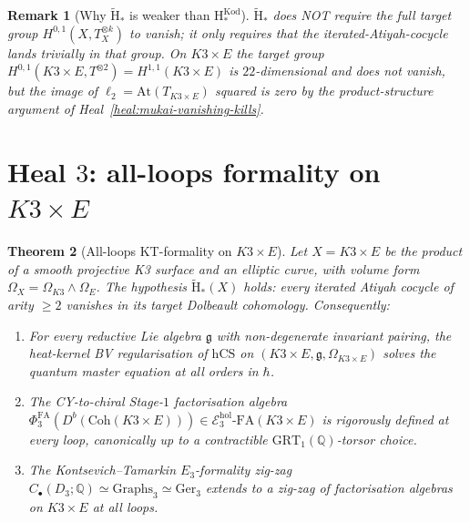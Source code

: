 \documentclass[11pt]{article}
\newtheorem{theorem}{Theorem}[section]
\newtheorem{remark}[theorem]{Remark}
\providecommand{\At}{\mathrm{At}}
\providecommand{\hCS}{\mathrm{hCS}}
\providecommand{\Coh}{\mathrm{Coh}}
\providecommand{\Om}{\Omega}
\providecommand{\fg}{\mathfrak{g}}
\providecommand{\QQ}{\mathbb{Q}}
\providecommand{\PhiFA}{\Phi^{\mathrm{FA}}}
\providecommand{\Ger}{\mathrm{Ger}}
\providecommand{\GRT}{\mathrm{GRT}}
\providecommand{\Graphs}{\mathrm{Graphs}}
\begin{document}
\begin{remark}[Why $\widetilde{\mathrm{H}}_*$ is weaker than
$\mathrm{H}_*^{\mathrm{Kod}}$]
\label{rem:tilde-weaker}
$\widetilde{\mathrm{H}}_*$ does NOT require the full target group
$H^{0,1}(X, T_X^{\otimes k})$ to vanish;  it only requires that
the iterated-Atiyah-cocycle lands trivially in that group.  On
$K3 \times E$ the target group $H^{0,1}(K3 \times E, T^{\otimes 2})
= H^{1,1}(K3 \times E)$ is $22$-dimensional and does not vanish,
but the \emph{image} of $\ell_2 = \At(T_{K3\times E})$ squared is
zero by the product-structure argument of
Heal~\ref{heal:mukai-vanishing-kills}.
\end{remark}

\section{Heal $3$:  all-loops formality on $K3 \times E$}
\label{sec:heal-3-k3e-all-loops}

\begin{theorem}[All-loops KT-formality on $K3 \times E$]
\label{thm:k3e-all-loops}
\ClaimStatusTheorem
Let $X = K3 \times E$ be the product of a smooth projective K3
surface and an elliptic curve, with volume form $\Om_X = \Om_{K3}
\wedge \Om_E$.  The hypothesis $\widetilde{\mathrm{H}}_*(X)$ holds:
every iterated Atiyah cocycle of arity $\geq 2$ vanishes in its
target Dolbeault cohomology.  Consequently:
\begin{enumerate}[label=\textup{(\arabic*)}]
\item For every reductive Lie algebra $\fg$ with non-degenerate
invariant pairing, the heat-kernel BV regularisation of $\hCS$ on
$(K3 \times E, \fg, \Om_{K3\times E})$ solves the quantum master
equation at all orders in $\hbar$.
\item The CY-to-chiral Stage-$1$ factorisation algebra
$\PhiFA_3(D^b(\Coh(K3 \times E))) \in \mathcal E_3^{\mathrm{hol}}\text{-}
\mathrm{FA}(K3 \times E)$ is rigorously defined at every loop,
canonically up to a contractible $\GRT_1(\QQ)$-torsor choice.
\item The Kontsevich--Tamarkin $E_3$-formality zig-zag
$C_\bullet(D_3; \QQ) \simeq \Graphs_3 \simeq \Ger_3$
extends to a zig-zag of factorisation algebras on $K3 \times E$
at all loops.
\end{enumerate}
\end{theorem}
\end{document}
